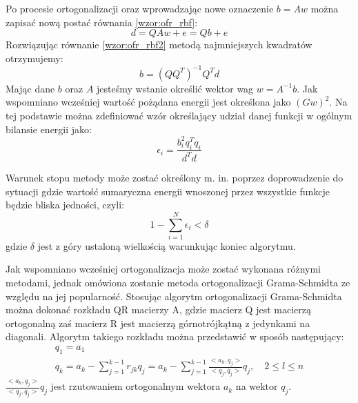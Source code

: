 Po procesie ortogonalizacji oraz wprowadzając nowe oznaczenie $b = Aw$ można zapisać nową postać równania \ref{wzor:ofr_rbf}:
\begin{equation}
	\label{wzor:ofr_rbf2}
	d = QAw + e = Qb + e
\end{equation}
Rozwiązując równanie \ref{wzor:ofr_rbf2} metodą najmniejszych kwadratów otrzymujemy:
\begin{equation}
	b = (QQ^T)^{-1}Q^Td
\end{equation}
Mając dane $b$ oraz $A$ jesteśmy wstanie określić wektor wag $w = A^{-1}b$.
Jak wspomniano wcześniej wartość pożądana energii jest określona jako $(Gw)^2$. Na tej podstawie można zdefiniować wzór określający udział danej funkcji w ogólnym bilansie energii jako:
\begin{equation}
	\epsilon_i = \frac{b_i^2q_i^Tq_i}{d^Td}
\end{equation}

Warunek stopu metody może zostać określony m. in. poprzez doprowadzenie do sytuacji gdzie wartość sumaryczna energii wnoszonej przez wszystkie funkcje będzie bliska jedności, czyli:
\begin{equation}
	1 - \sum_{i=1}^N \epsilon_i < \delta
\end{equation}
gdzie $\delta$ jest z góry ustaloną wielkością warunkując koniec algorytmu.

Jak wspomniano wcześniej ortogonalizacja może zostać wykonana różnymi metodami, jednak omówiona zostanie metoda ortogonalizacji Grama-Schmidta ze względu na jej popularność. Stosując algorytm ortogonalizacji Grama-Schmidta można dokonać rozkładu QR macierzy A, gdzie macierz Q jest macierzą ortogonalną zaś macierz R jest macierzą górnotrójkątną z jedynkami na diagonali. Algorytm takiego rozkładu można przedstawić w sposób następujący\cite{Bernardelli}:
\begin{equation}
	\begin{array}{l}
	q_1 = a_1 \\
	q_k = a_k - \sum_{j=1}^{k-1} r_{jk}q_j = a_k - \sum_{j=1}^{k-1} \frac{<a_k,q_j>}{<q_j,q_j>} q_j, \quad 2 \leq l  \leq n 
\end{array}
\end{equation}
$\frac{<a_k,q_j>}{<q_j,q_j>} q_j$ jest rzutowaniem ortogonalnym wektora $a_k$ na wektor $q_j$.

